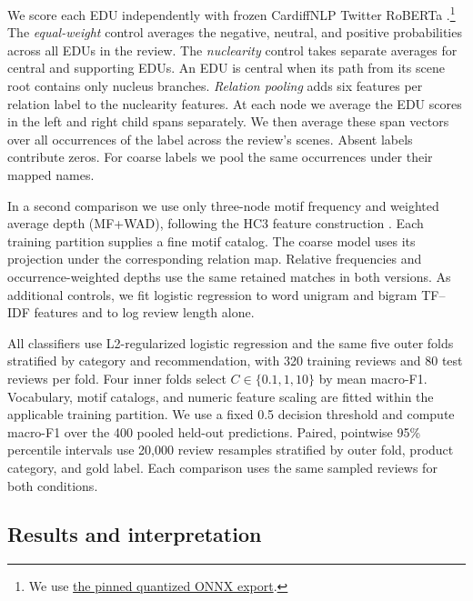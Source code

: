 We score each EDU independently with frozen CardiffNLP Twitter RoBERTa
\citep{loureiro_timelms_2022}.\footnote{We use
\href{https://huggingface.co/Xenova/twitter-roberta-base-sentiment-latest/tree/f3ec4d0925f90c3ca7ee7814f52d6ee7cf180445}{the pinned quantized ONNX export}.}
The \emph{equal-weight} control averages the negative, neutral, and
positive probabilities across all EDUs in the review. The
\emph{nuclearity} control takes separate averages for central and
supporting EDUs. An EDU is central when its path from its scene root
contains only nucleus branches. \emph{Relation pooling} adds six features
per relation label to the nuclearity features. At each node we average
the EDU scores in the left and right child spans separately. We then
average these span vectors over all occurrences of the label across
the review's scenes. Absent labels contribute zeros. For coarse labels
we pool the same occurrences under their mapped names.

In a second comparison we use only three-node motif frequency and
weighted average depth (MF+WAD), following the HC3 feature construction
\citep{kim_threads_2024}. Each training partition supplies a fine motif
catalog. The coarse model uses its projection under the corresponding
relation map. Relative frequencies and occurrence-weighted depths use
the same retained matches in both versions. As additional controls, we
fit logistic regression to word unigram and bigram TF--IDF features and
to log review length alone.

All classifiers use L2-regularized logistic regression and the same five
outer folds stratified by category and recommendation, with 320 training
reviews and 80 test reviews per fold. Four inner folds select
$C \in \{0.1,1,10\}$ by mean macro-F1. Vocabulary, motif catalogs, and
numeric feature scaling are fitted within the applicable training
partition. We use a fixed 0.5 decision threshold and compute macro-F1
over the 400 pooled held-out predictions. Paired, pointwise 95\% percentile
intervals use 20,000 review resamples stratified by outer fold, product
category, and gold label. Each comparison uses the same sampled reviews
for both conditions.

\subsection{Results and interpretation}

